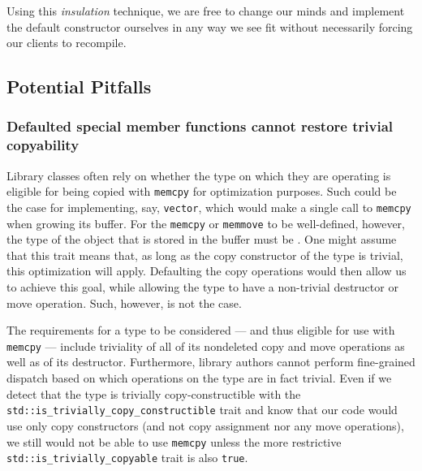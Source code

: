 \noindent Using this \emph{insulation} technique, we are free to change our minds
and implement the default constructor ourselves in any way we see fit
without necessarily forcing our clients to recompile.

\subsection[Potential Pitfalls]{Potential Pitfalls}\label{potential-pitfalls}

\subsubsection[Defaulted special member functions cannot restore trivial copyability]{Defaulted special member functions cannot restore trivial copyability}

Library classes often rely on whether the type on which they are operating is eligible for being copied with \lstinline!memcpy! for optimization purposes.  Such could be the case for implementing, say, \lstinline!vector!, which would make a single call to \lstinline!memcpy! when growing its buffer.  For the \lstinline!memcpy! or \lstinline!memmove! to be well-defined, however, the type of the object that is stored in the buffer must be .  One might assume that this trait means that, as long as the copy constructor of the type is trivial, this optimization will apply.  Defaulting the copy operations would then allow us to achieve this goal, while allowing the type to have a non-trivial destructor or move operation.  Such, however, is not the case.

The requirements for a type to be considered  --- and thus eligible for use with \lstinline!memcpy! --- include triviality of all of its nondeleted copy and move operations as well as of its destructor.  Furthermore, library authors cannot perform fine-grained dispatch based on which operations on the type are in fact trivial.  Even if we detect that the type is trivially copy-constructible with the \lstinline!std::is_trivially_copy_constructible! trait and know that our code would use only copy constructors (and not copy assignment nor any move operations), we still would not be able to use \lstinline!memcpy! unless the more restrictive \lstinline!std::is_trivially_copyable! trait is also \lstinline!true!.


